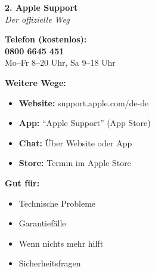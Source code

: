 \documentclass[a4paper,landscape,8pt]{extarticle}
\begin{document}
\hfill%
\begin{minipage}[t]{0.32\linewidth}
\begin{center}
\colorbox{appleblue!15}{%
\begin{minipage}{0.95\linewidth}
\vspace{2mm}
\begin{center}
{\Large\bfseries\textcolor{appleblue}{2. Apple Support}}\\[1pt]
{\footnotesize\itshape Der offizielle Weg}
\end{center}
\vspace{2mm}
\end{minipage}%
}
\end{center}

\vspace{1mm}

\textbf{Telefon (kostenlos):}\\
{\Large\bfseries 0800 6645 451}\\
{\footnotesize Mo--Fr 8--20 Uhr, Sa 9--18 Uhr}

\textbf{Weitere Wege:}
\begin{itemize}
\item \textbf{Website:} support.apple.com/de-de
\item \textbf{App:} ``Apple Support'' (App Store)
\item \textbf{Chat:} Über Website oder App
\item \textbf{Store:} Termin im Apple Store
\end{itemize}

\textbf{Gut für:}
\begin{itemize}
\item Technische Probleme
\item Garantiefälle
\item Wenn nichts mehr hilft
\item Sicherheitsfragen
\end{itemize}

\vspace{2mm}

\end{minipage}%
\hfill%
\end{document}

